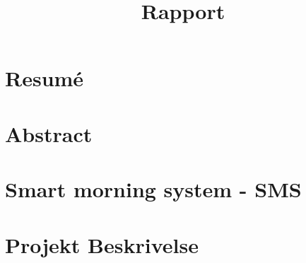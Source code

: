 \documentclass[11pt]{article}
\title{Rapport}
\begin{document}
\maketitle
\section{Resumé}
\section{Abstract}
\vfill
\pagebreak

\tableofcontents
\vfill
\pagebreak


\section{Smart morning system - SMS}
\section{Projekt Beskrivelse}
\end{document}
